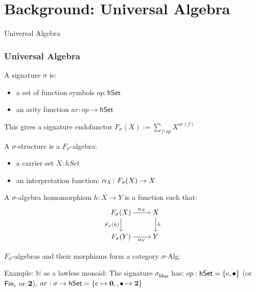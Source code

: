 \documentclass[9pt]{beamer}
\begin{document}
\section{Background: Universal Algebra}

\begin{frame}[fragile]{Universal Algebra}
\frametitle{Universal Algebra}

A \alert{signature} $\sigma$ is:
\begin{itemize}
    \item a set of \alert{function symbols} $op : \mathsf{hSet}$
    \item an \alert{arity function} $ar : op \rightarrow \mathsf{hSet}$
\end{itemize}

This gives a signature endofunctor $F_{\sigma}(X) := \sum_{f : op} X^{ar(f)}$

A $\sigma$-structure is a $F_{\sigma}$-algebra:
\begin{itemize}
    \item a \alert{carrier set} $X : hSet$
    \item an \alert{interpretation function}: $\alpha_X\colon\Sig(X) \to X$
\end{itemize}

A $\sigma$-algebra homomorphism $h: X \rightarrow Y$ is a function such that:
\[\begin{tikzcd}[ampersand replacement=\&,cramped]
	{F_{\sigma}(X)} \& X \\
	{F_{\sigma}(Y)} \& Y
	\arrow["{\alpha_X}", from=1-1, to=1-2]
	\arrow["{F_{\sigma}(h)}"', from=1-1, to=2-1]
	\arrow["{\alpha_Y}"', from=2-1, to=2-2]
	\arrow["h", from=1-2, to=2-2]
\end{tikzcd}\]

$F_{\sigma}$-algebras and their morphisms form a category $\sigma$-Alg.

Example: $\mathbb{N}$ as a \alert{lawless monoid}:
The signature $\sigma_{\mathsf{Mon}}$ has:
$op : \mathsf{hSet} = \{e, \bullet\}$ (or $\Fin[2]$ or ${\mathbf{2}}$),
$ar : \sigma \rightarrow \mathsf{hSet} = \{e \mapsto \mathbf{0},, \bullet \mapsto {\mathbf{2}}\}$

\end{frame}
\end{document}
